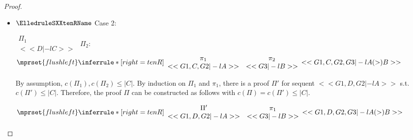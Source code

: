 \begin{proof}
\begin{enumerate}
\begin{itemize}
  \item $\ElledruleSXXtenRName$ Case 2:
      \begin{center}
        \scriptsize
        \begin{math}
          \begin{array}{c}
            \Pi_1 \\
            {<<D |-l C>>}
          \end{array}
        \end{math}
        \qquad\qquad
        $\Pi_2$:
        \begin{math}
          $$\mprset{flushleft}
          \inferrule* [right={\tiny tenR}] {
            {
              \begin{array}{cc}
                \pi_1 & \pi_2 \\
                {<<G1, C, G2 |-l A>>} & {<<G3 |-l B>>}
              \end{array}
            }
          }{<<G1, C, G2, G3 |-l A (>) B>>}
        \end{math}
      \end{center}
      By assumption, $c(\Pi_1),c(\Pi_2)\leq |C|$. By induction on $\Pi_1$ and $\pi_1$, there
      is a proof $\Pi'$ for sequent $<<G1, D, G2 |-l A>>$ s.t. $c(\Pi') \leq |C|$. Therefore,
      the proof $\Pi$ can be constructed as follows with $c(\Pi) = c(\Pi') \leq |C|$.
      \begin{center}
        \scriptsize
        \begin{math}
          $$\mprset{flushleft}
          \inferrule* [right={\tiny tenR}] {
            {
              \begin{array}{cc}
                \Pi' & \pi_1 \\
                {<<G1, D, G2 |-l A>>} & {<<G3 |-l B>>}
              \end{array}
            }
          }{<<G1, D, G2, G3 |-l A (>) B>>}
        \end{math}
      \end{center}


\end{itemize}
\end{enumerate}
\end{proof}
